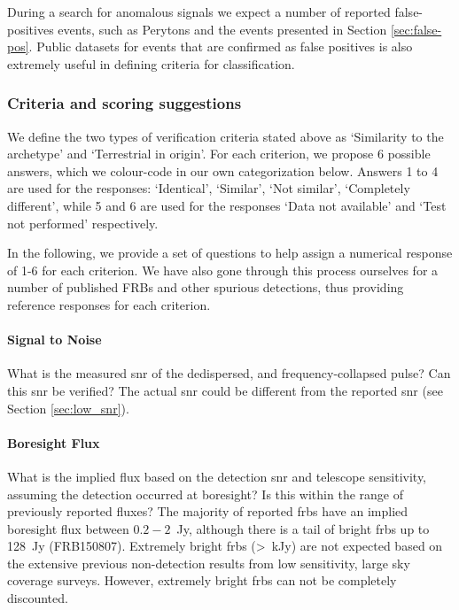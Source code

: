 \documentclass[a4paper,fleqn,usenatbib]{mnras}
\begin{document}
During a search for anomalous signals we expect a number of reported
false-positives events, such as Perytons \citep{2011ApJ...727...18B} and the
events presented in Section \ref{sec:false-pos}.  Public datasets for events
that are confirmed as false positives is also extremely useful in defining
criteria for classification. 

\subsubsection{Criteria and scoring suggestions}

We define the two types of verification criteria stated above as `Similarity to
the archetype' and `Terrestrial in origin'. For each criterion, we propose 6
possible answers, which we colour-code in our own categorization below. Answers
1 to 4 are used for the responses: `Identical', `Similar', `Not similar',
`Completely different', while 5 and 6 are used for the responses `Data not
available' and `Test not performed' respectively.

In the following, we provide a set of questions to help assign a numerical
response of 1-6 for each criterion. We have also gone through this process
ourselves for a number of published FRBs and other spurious detections, thus
providing reference responses for each criterion.  

\paragraph{Signal to Noise}

What is the measured \gls{snr} of the dedispersed, and frequency-collapsed
pulse? Can this \gls{snr} be verified? The actual \gls{snr} could be different
from the reported \gls{snr} (see Section \ref{sec:low_snr}).


\paragraph{Boresight Flux}

What is the implied flux based on the detection \gls{snr} and telescope
sensitivity, assuming the detection occurred at boresight? Is this within the
range of previously reported fluxes? The majority of reported \glspl{frb} have
an implied boresight flux between $0.2-2$~Jy, although there is a tail of bright
\glspl{frb} up to 128~Jy (FRB150807). Extremely bright \glspl{frb} (>~kJy) are
not expected based on the extensive previous non-detection results from low
sensitivity, large sky coverage surveys. However, extremely bright \glspl{frb}
can not be completely discounted.
\end{document}
